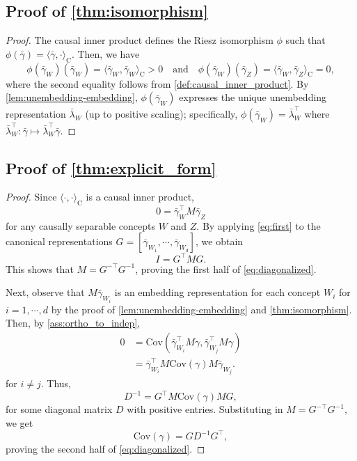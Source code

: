 \documentclass{article}
\theoremstyle{plain}
\theoremstyle{definition}
\theoremstyle{remark}
\newcommand{\cov}{\mathrm{Cov}}
\newcommand{\ip}[2]{\langle #1,#2\rangle}
\begin{document}
\subsection{Proof of \cref{thm:isomorphism}}
\RepresentationUnification*
\begin{proof}
    The causal inner product defines the Riesz isomorphism $\phi$ such that $\phi(\bar\gamma) = \ip{\bar\gamma}{\cdot}_{\mathrm{C}}$. Then, we have
    \begin{equation}
        \phi(\bar\gamma_W)(\bar\gamma_W) = \ip{\bar\gamma_W}{\bar\gamma_W}_{\mathrm{C}} >0\quad \text{and}\quad \phi(\bar\gamma_W)(\bar\gamma_Z) = \ip{\bar\gamma_W}{\bar\gamma_Z}_{\mathrm{C}} =0 ,
    \end{equation}
    where the second equality follows from \cref{def:causal_inner_product}.
    By \cref{lem:unembedding-embedding}, $\phi(\bar{\gamma}_W)$ expresses the unique unembedding representation $\bar\lambda_W$ (up to positive scaling); specifically, $\phi(\bar\gamma_W) = \bar\lambda_W^\top$ where $\bar\lambda_W^\top: \bar\gamma \mapsto \bar\lambda_W^\top\bar\gamma$.
\end{proof}

\subsection{Proof of \cref{thm:explicit_form}}
\ExplicitCIP*
\begin{proof}
    Since $\ip{\cdot}{\cdot}_{\mathrm{C}}$ is a causal inner product,
    \begin{equation}
        0 =  \bar\gamma_W^\top M \bar\gamma_Z\label{eq:first}
    \end{equation}
    for any causally separable concepts $W$ and $Z$. 
    By applying \eqref{eq:first} to the canonical representations $G = [\bar{\gamma}_{W_1}, \cdots, \bar{\gamma}_{W_d}]$, we obtain
    \begin{equation}
        I = G^\top M G.
    \end{equation}
    This shows that $M = G^{-\top} G^{-1}$, proving the first half of \eqref{eq:diagonalized}.
    
    Next, observe that $M \bar\gamma_{W_i}$ is an embedding representation for each concept $W_i$ for $i=1,\cdots, d$ by the proof of \cref{lem:unembedding-embedding} and \cref{thm:isomorphism}. Then, by \cref{ass:ortho_to_indep},
    \begin{align}
        0 &= \cov(\bar{\gamma}_{W_i}^\top M \gamma, \bar{\gamma}_{W_j}^\top M \gamma) \\
          &= \bar{\gamma}_{W_i}^\top M \cov(\gamma) M \bar{\gamma}_{W_j}.
    \end{align}
    for $i \neq j$. 
    Thus,
    \begin{equation}
        D^{-1} = G^\top M \cov (\gamma) M G,
    \end{equation}
    for some diagonal matrix $D$ with positive entries. Substituting in $M = G^{-\top} G^{-1}$, we get
    \begin{equation}
        \cov (\gamma) = G D^{-1}G^{\top},
    \end{equation}
    proving the second half of \eqref{eq:diagonalized}.
\end{proof}
\end{document}
